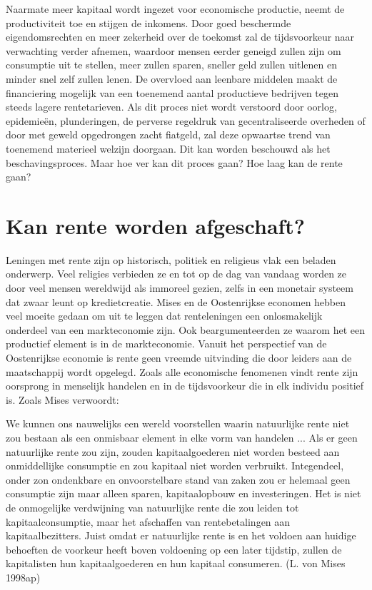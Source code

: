 \documentclass[
  a5paper,
  smalldemyvopaper,11pt,twoside,onecolumn,openright,extrafontsizes,
hidelinks]{memoir}
\begin{document}
Naarmate meer kapitaal wordt ingezet voor economische productie, neemt
de productiviteit toe en stijgen de inkomens. Door goed beschermde
eigendomsrechten en meer zekerheid over de toekomst zal de tijdsvoorkeur
naar verwachting verder afnemen, waardoor mensen eerder geneigd zullen
zijn om consumptie uit te stellen, meer zullen sparen, sneller geld
zullen uitlenen en minder snel zelf zullen lenen. De overvloed aan
leenbare middelen maakt de financiering mogelijk van een toenemend
aantal productieve bedrijven tegen steeds lagere rentetarieven. Als dit
proces niet wordt verstoord door oorlog, epidemieën, plunderingen, de
perverse regeldruk van gecentraliseerde overheden of door met geweld
opgedrongen zacht fiatgeld, zal deze opwaartse trend van toenemend
materieel welzijn doorgaan. Dit kan worden beschouwd als het
beschavingsproces. Maar hoe ver kan dit proces gaan? Hoe laag kan de
rente gaan?

\section{Kan rente worden
afgeschaft?}\label{kan-rente-worden-afgeschaft}

Leningen met rente zijn op historisch, politiek en religieus vlak een
beladen onderwerp. Veel religies verbieden ze en tot op de dag van
vandaag worden ze door veel mensen wereldwijd als immoreel gezien, zelfs
in een monetair systeem dat zwaar leunt op kredietcreatie. Mises en de
Oostenrijkse economen hebben veel moeite gedaan om uit te leggen dat
renteleningen een onlosmakelijk onderdeel van een markteconomie zijn.
Ook beargumenteerden ze waarom het een productief element is in de
markteconomie. Vanuit het perspectief van de Oostenrijkse economie is
rente geen vreemde uitvinding die door leiders aan de maatschappij wordt
opgelegd. Zoals alle economische fenomenen vindt rente zijn oorsprong in
menselijk handelen en in de tijdsvoorkeur die in elk individu positief
is. Zoals Mises verwoordt:

We kunnen ons nauwelijks een wereld voorstellen waarin natuurlijke rente
niet zou bestaan als een onmisbaar element in elke vorm van handelen ...
Als er geen natuurlijke rente zou zijn, zouden kapitaalgoederen niet
worden besteed aan onmiddellijke consumptie en zou kapitaal niet worden
verbruikt. Integendeel, onder zon ondenkbare en onvoorstelbare stand van
zaken zou er helemaal geen consumptie zijn maar alleen sparen,
kapitaalopbouw en investeringen. Het is niet de onmogelijke verdwijning
van natuurlijke rente die zou leiden tot kapitaalconsumptie, maar het
afschaffen van rentebetalingen aan kapitaalbezitters. Juist omdat er
natuurlijke rente is en het voldoen aan huidige behoeften de voorkeur
heeft boven voldoening op een later tijdstip, zullen de kapitalisten hun
kapitaalgoederen en hun kapitaal consumeren. (L. von Mises 1998ap)
\end{document}

